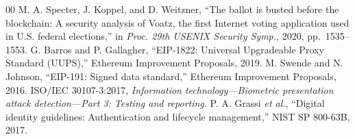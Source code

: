 \documentclass[conference]{IEEEtran}
\begin{document}
\begin{thebibliography}{00}
 M. A. Specter, J. Koppel, and D. Weitzner, ``The ballot is busted before the blockchain: A security analysis of Voatz, the first Internet voting application used in U.S. federal elections,'' in \emph{Proc. 29th USENIX Security Symp.}, 2020, pp.~1535--1553.
 G. Barros and P. Gallagher, ``EIP-1822: Universal Upgradeable Proxy Standard (UUPS),'' Ethereum Improvement Proposals, 2019.
 M. Swende and N. Johnson, ``EIP-191: Signed data standard,'' Ethereum Improvement Proposals, 2016.
 ISO/IEC 30107-3:2017, \emph{Information technology---Biometric presentation attack detection---Part 3: Testing and reporting}.
 P. A. Grassi \emph{et al.}, ``Digital identity guidelines: Authentication and lifecycle management,'' NIST SP 800-63B, 2017.
\end{thebibliography}
\end{document}
